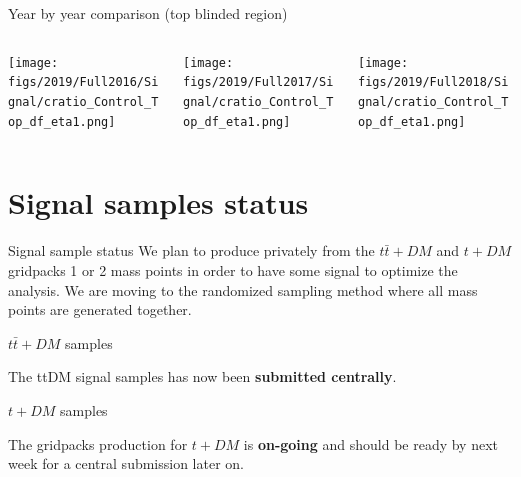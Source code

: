 \documentclass[9pt]{beamer}
\begin{document}
\begin{frame}{Year by year comparison (top blinded region)}
\begin{columns}
		\begin{column}{0.32\textwidth}
			\begin{center}
     			\texttt{[image: figs/2019/Full2016/Signal/cratio\_Control\_Top\_df\_eta1.png]}
    		\end{center}		
		\end{column} \hfill
		\begin{column}{0.32\textwidth}
			\begin{center}
     			\texttt{[image: figs/2019/Full2017/Signal/cratio\_Control\_Top\_df\_eta1.png]}
    		\end{center}		
		\end{column} \hfill
		\begin{column}{0.32\textwidth}
			\begin{center}
     			\texttt{[image: figs/2019/Full2018/Signal/cratio\_Control\_Top\_df\_eta1.png]}
   			 \end{center}
		\end{column} \hfill
	\end{columns}
\end{frame}

\section{Signal samples status}

\begin{frame}{Signal sample status}
\justifying
We plan to produce privately from the $t\bar t+DM$ and $t+DM$ gridpacks 1 or 2 mass points in order to have some signal to optimize the analysis. \vfill
We are moving to the randomized sampling method where all mass points are generated together. \vfill
\begin{block}{\centering $t\bar t+DM$ samples}\end{block}
The ttDM signal samples has now been \textbf{submitted centrally}. \vfill
\begin{block}{\centering $t+DM$ samples}\end{block}
The gridpacks production for $t+DM$ is \textbf{on-going} and should be ready by next week for a central submission later on. \vfill
\end{frame}
\end{document}
